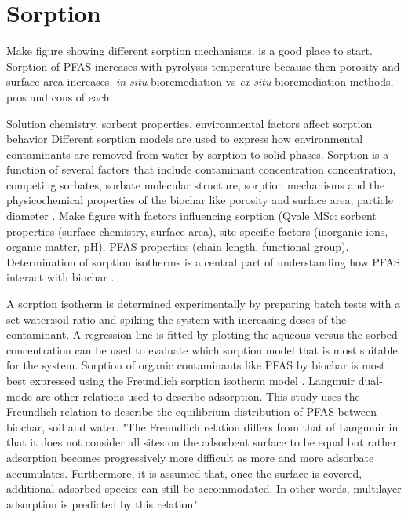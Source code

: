 
\section{Sorption}
Make figure showing different sorption mechanisms.\citep{Li2019} is a good place to start. Sorption of PFAS increases with pyrolysis temperature because then porosity and surface area increases.  \textit{in situ} bioremediation vs \textit{ex situ} bioremediation methods, pros and cons of each

Solution chemistry, sorbent properties, environmental factors affect sorption behavior \citep{du2014adsorption}
Different sorption models are used to express how environmental contaminants are removed from water by sorption to solid phases. Sorption is a function of several factors that include contaminant concentration concentration, competing sorbates, sorbate molecular structure, sorption mechanisms and the physicochemical properties of the biochar like porosity and surface area, particle diameter \citep{Li2019,du2014adsorption}. Make figure with factors influencing sorption (Qvale MSc: sorbent properties (surface chemistry, surface area), site-specific factors (inorganic ions, organic matter, pH), PFAS properties (chain length, functional group). Determination of sorption isotherms is a central part of understanding how PFAS interact with biochar \citep{Li2019}. 

A sorption isotherm is determined experimentally by preparing batch tests with a set water:soil ratio and spiking the system with increasing doses of the contaminant. A regression line is fitted by plotting the aqueous versus the sorbed concentration can be used to evaluate which sorption model that is most suitable for the system. Sorption of organic contaminants like PFAS by biochar is most best expressed using the Freundlich sorption isotherm model . Langmuir dual-mode are other relations used to describe adsorption. This study uses the Freundlich relation to describe the equilibrium distribution of PFAS between biochar, soil and water. "The Freundlich relation differs from that of Langmuir in that it does not consider all sites on the adsorbent surface to be equal but rather adsorption becomes progressively more difficult as more and more adsorbate accumulates. Furthermore, it is assumed that, once the surface is covered, additional adsorbed species can still be accommodated. In other words, multilayer adsorption is predicted by this relation" \citep{vanloon2017Ch14}

